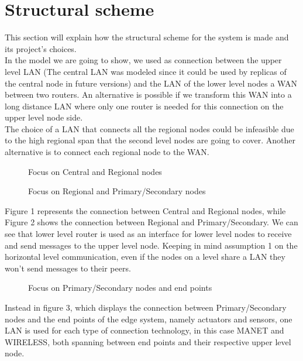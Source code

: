 \documentclass[11pt]{article}
\begin{document}
\section{Structural scheme}
This section will explain how the structural scheme for the system is made and its project's choices.\\
In the model we are going to show, we used as connection between the upper level LAN (The central LAN was modeled since it could be used by replicas of the central node in future versions) and the LAN of the lower level nodes a WAN between two routers.  An alternative is possible if we transform this WAN into a long distance LAN where only one router is needed for this connection on the upper level node side.\\
The choice of a LAN that connects all the regional nodes could be infeasible due to the high regional span that the second level nodes are going to cover. Another alternative is to connect each regional node to the WAN.
\begin{figure}[H]
	\hspace*{-3.75cm}
	\centering
  \frame{}
  \caption{Focus on Central and Regional nodes}
\end{figure}
\begin{figure}[H]
	\hspace*{-3.75cm}
	\frame{}
	\caption{Focus on Regional and Primary/Secondary nodes}
\end{figure}
Figure 1 represents the connection between Central and Regional nodes, while Figure 2 shows the connection between Regional and Primary/Secondary. We can  see that lower level router is used as an interface for lower level nodes to receive and send messages to the upper level node. Keeping in mind assumption 1 on the horizontal level communication, even if the nodes on a level share a LAN they won't send messages to their peers.\\
\begin{figure}[H]
	\hspace*{-3.75cm}
  \frame{}
  \caption{Focus on Primary/Secondary nodes and end points}
\end{figure}
Instead in figure 3, which displays the connection between Primary/Secondary nodes and the end points of the edge system, namely actuators and sensors, one LAN is used for each type of connection technology, in this case MANET and WIRELESS, both spanning between end points and their respective upper level node.\\
\end{document}
